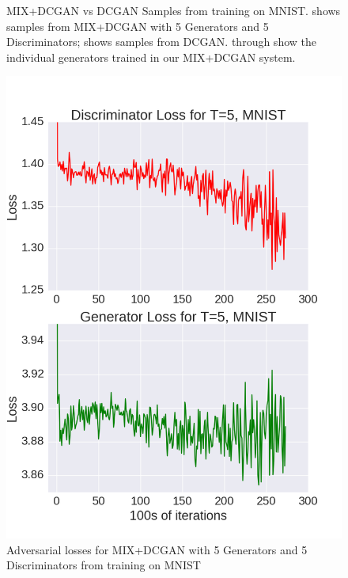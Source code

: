 \documentclass{article}
\begin{document}
\begin{figure}[!htb]
{  }

  \caption{MIX+DCGAN vs DCGAN Samples from training on MNIST. 
    \protect{} shows samples from MIX+DCGAN with 5 Generators and 5 Discriminators; \protect{} shows samples from DCGAN. \protect{} through \protect{} show the individual generators trained in our MIX+DCGAN system.
  }
  \label{fig:ex4}%
\end{figure}

\begin{figure}[!htb]%
  \centering
  \includegraphics[width=.85\linewidth]{figures/Loss_Graph_MNIST_T=5.png}
  \caption{Adversarial losses for MIX+DCGAN with 5 Generators and 5 Discriminators from training on MNIST}
  \label{fig5}
\end{figure}
\end{document}
